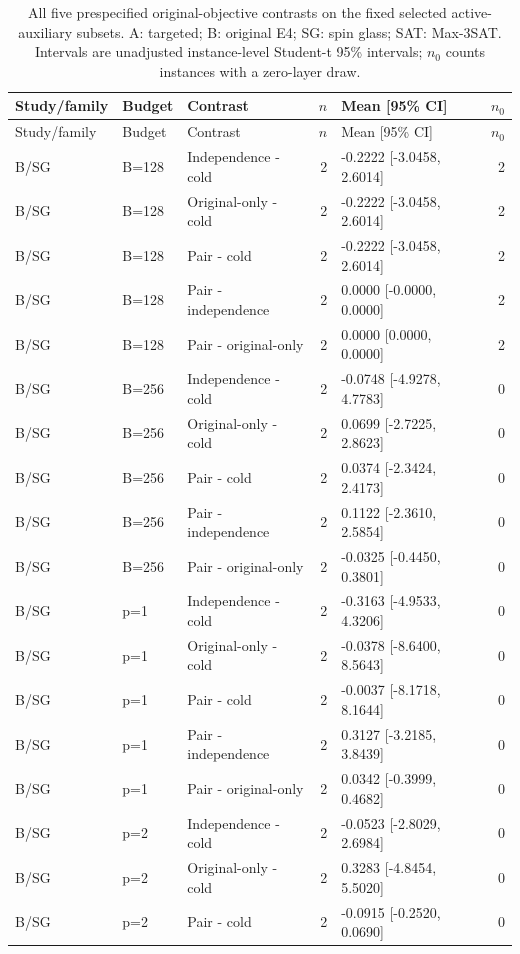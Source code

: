 \begin{longtable}{lllrlr}
\caption{All five prespecified original-objective contrasts on the fixed selected active-auxiliary subsets. A: targeted; B: original E4; SG: spin glass; SAT: Max-3SAT. Intervals are unadjusted instance-level Student-t 95\% intervals; $n_0$ counts instances with a zero-layer draw.}\label{tab:warmstart-correction-all-contrasts}\\
\hline
Study/family & Budget & Contrast & $n$ & Mean [95\% CI] & $n_0$ \\
\hline\endfirsthead
\hline Study/family & Budget & Contrast & $n$ & Mean [95\% CI] & $n_0$ \\\hline\endhead
B/SG & B=128 & Independence - cold & 2 & -0.2222 [-3.0458, 2.6014] & 2 \\
B/SG & B=128 & Original-only - cold & 2 & -0.2222 [-3.0458, 2.6014] & 2 \\
B/SG & B=128 & Pair - cold & 2 & -0.2222 [-3.0458, 2.6014] & 2 \\
B/SG & B=128 & Pair - independence & 2 & 0.0000 [-0.0000, 0.0000] & 2 \\
B/SG & B=128 & Pair - original-only & 2 & 0.0000 [0.0000, 0.0000] & 2 \\
B/SG & B=256 & Independence - cold & 2 & -0.0748 [-4.9278, 4.7783] & 0 \\
B/SG & B=256 & Original-only - cold & 2 & 0.0699 [-2.7225, 2.8623] & 0 \\
B/SG & B=256 & Pair - cold & 2 & 0.0374 [-2.3424, 2.4173] & 0 \\
B/SG & B=256 & Pair - independence & 2 & 0.1122 [-2.3610, 2.5854] & 0 \\
B/SG & B=256 & Pair - original-only & 2 & -0.0325 [-0.4450, 0.3801] & 0 \\
B/SG & p=1 & Independence - cold & 2 & -0.3163 [-4.9533, 4.3206] & 0 \\
B/SG & p=1 & Original-only - cold & 2 & -0.0378 [-8.6400, 8.5643] & 0 \\
B/SG & p=1 & Pair - cold & 2 & -0.0037 [-8.1718, 8.1644] & 0 \\
B/SG & p=1 & Pair - independence & 2 & 0.3127 [-3.2185, 3.8439] & 0 \\
B/SG & p=1 & Pair - original-only & 2 & 0.0342 [-0.3999, 0.4682] & 0 \\
B/SG & p=2 & Independence - cold & 2 & -0.0523 [-2.8029, 2.6984] & 0 \\
B/SG & p=2 & Original-only - cold & 2 & 0.3283 [-4.8454, 5.5020] & 0 \\
B/SG & p=2 & Pair - cold & 2 & -0.0915 [-0.2520, 0.0690] & 0 \\

\end{longtable}
